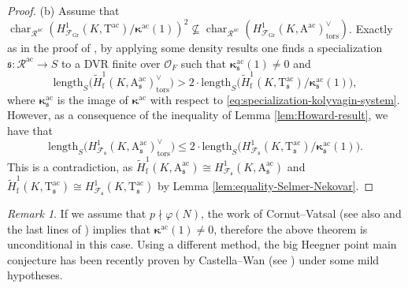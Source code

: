 \documentclass[12pt,reqno]{amsart}
\theoremstyle{definition}
\theoremstyle{remark}
\newtheorem{remark}[theorem]{Remark}
\newcommand{\OF}{\mathcal{O}_F}
\newcommand{\T}{\boldsymbol{\mathrm{T}}}
\newcommand{\calR}{\mathcal{R}}
\newcommand{\A}{\boldsymbol{\mathrm{A}}}
\DeclareMathOperator{\Char}{char}
\newcommand{\ac}{\mathrm{ac}}
\newcommand{\Gr}{\mathrm{Gr}}
\newcommand{\f}{\mathrm{f}}
\newcommand{\tors}{\mathrm{tors}}
\newcommand{\length}{\mathrm{length}}
\newcommand{\gk}{\kappa}
\newcommand{\sfrak}{\mathfrak{s}}
\begin{document}
\begin{proof}
    (b) Assume that $\Char_{\calR^\ac}(H^1_{\mathcal{F}_\Gr}(K,\T^\ac)/\boldsymbol{\gk}^\ac(1))^2\not\subseteq\Char_{\calR^\ac}(H^1_{\mathcal{F}_\Gr}(K,\A^\ac)^\vee_{\tors})$. Exactly as in the proof of \cite[Theorem 6.3]{Fouquet13:Dihedral}, by applying some density results one finds a specialization $\sfrak\colon\calR^\ac\to S$ to a DVR finite over $\OF$ such that $\boldsymbol{\gk}^\ac_\sfrak(1)\ne 0$ and 
    \begin{equation*}
        \length_S\big(\tilde{H}_\f^1(K,\A^\ac_\sfrak)^\vee_{\tors}\big)> 2\cdot\length_S\big(\tilde{H}^1_{\f}(K,\T^\ac_\sfrak)/\boldsymbol{\gk}_\sfrak^\ac(1)\big),
    \end{equation*}
    where $\boldsymbol{\gk}^\ac_\sfrak$ is the image of $\boldsymbol{\gk}^\ac$ with respect to \eqref{eq:specialization-kolyvagin-system}. However, as a consequence of the inequality of Lemma \ref{lem:Howard-result}, we have that
     \begin{equation*}
        \length_S\big(H_{\mathcal{F}_\sfrak}^1(K,\A^\ac_\sfrak)^\vee_{\tors}\big)\le 2\cdot\length_S\big(H_{\mathcal{F}_\sfrak}^1(K,\T^\ac_\sfrak)/\boldsymbol{\gk}_\sfrak^\ac(1)\big).
    \end{equation*}
    This is a contradiction, as $\tilde{H}_\f^1(K,\A^\ac_\sfrak)\cong H_{\mathcal{F}_\sfrak}^1(K,\A^\ac_\sfrak)$ and $\tilde{H}^1_{\f}(K,\T^\ac_\sfrak)\cong H_{\mathcal{F}_\sfrak}^1(K,\T^\ac_\sfrak)$ by Lemma \ref{lem:equality-Selmer-Nekovar}.
\end{proof}

\begin{remark}
    If we assume that $p\nmid\varphi(N)$, the work of Cornut--Vatsal \cite{cornut-vatsal2007:nontriviality} (see also \cite[Corollary 3.1.2]{Howard07:variation-of-Heegner-points-in-Hida-families} and the last lines of \cite[§4.3]{Castella-Wan:iwasawa-main-conjecture-for-GL2}) implies that $\boldsymbol{\gk}^\ac(1)\ne 0$, therefore the above theorem is unconditional in this case. Using a different method, the big Heegner point main conjecture has been recently proven by Castella--Wan (see \cite[Theorem 5.1]{Castella-Wan:iwasawa-main-conjecture-for-GL2}) under some mild hypotheses.
\end{remark}













\appendix
\end{document}

